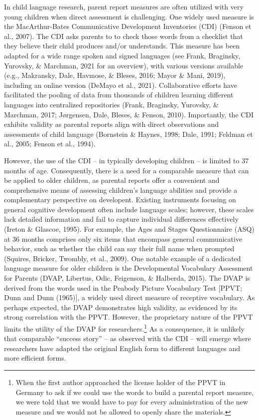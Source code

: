 \documentclass[
  man,floatsintext]{apa6}
\begin{document}
In child language research, parent report measures are often utilized with very young children when direct assessment is challenging. One widely used measure is the MacArthur-Bates Communicative Development Inventories (CDI) (Fenson et al., 2007). The CDI asks parents to to check those words from a checklist that they believe their child produces and/or understands. This measure has been adapted for a wide range spoken and signed languages (see Frank, Braginsky, Yurovsky, \& Marchman, 2021 for an overview), with various versions available (e.g., Makransky, Dale, Havmose, \& Bleses, 2016; Mayor \& Mani, 2019), including an online version (DeMayo et al., 2021). Collaborative efforts have facilitated the pooling of data from thousands of children learning different languages into centralized repositories (Frank, Braginsky, Yurovsky, \& Marchman, 2017; Jørgensen, Dale, Bleses, \& Fenson, 2010). Importantly, the CDI exhibits validity as parental reports align with direct observations and assessments of child language (Bornstein \& Haynes, 1998; Dale, 1991; Feldman et al., 2005; Fenson et al., 1994).

However, the use of the CDI -- in typically developing children -- is limited to 37 months of age. Consequently, there is a need for a comparable measure that can be applied to older children, as parental reports offer a convenient and comprehensive means of assessing children's language abilities and provide a complementary perspective on developent. Existing instruments focusing on general cognitive development often include language scales; however, these scales lack detailed information and fail to capture individual differences effectively (Ireton \& Glascoe, 1995). For example, the Ages and Stages Questionnaire (ASQ) at 36 months comprises only six items that encompass general communicative behavior, such as whether the child can say their full name when prompted (Squires, Bricker, Twombly, et al., 2009). One notable example of a dedicated language measure for older children is the Developmental Vocabulary Assessment for Parents (DVAP, Libertus, Odic, Feigenson, \& Halberda, 2015). The DVAP is derived from the words used in the Peabody Picture Vocabulary Test {[}PPVT; Dunn and Dunn (1965){]}, a widely used direct measure of receptive vocabulary. As perhaps expected, the DVAP demonstrates high validity, as evidenced by its strong correlation with the PPVT. However, the proprietary nature of the PPVT limits the utility of the DVAP for researchers.\footnote{When the first author approached the license holder of the PPVT in Germany to ask if we could use the words to build a parental report measure, we were told that we would have to pay for every administration of the new measure and we would not be allowed to openly share the materials.} As a consequence, it is unlikely that comparable ``success story'' -- as observed with the CDI -- will emerge where researchers have adapted the original English form to different languages and more efficient forms.
\end{document}
